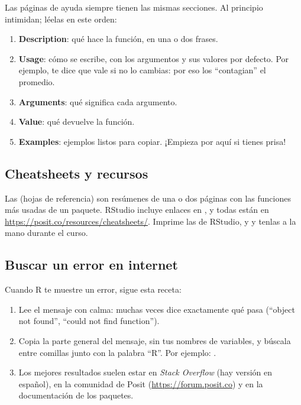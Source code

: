 Las páginas de ayuda siempre tienen las mismas secciones. Al principio
intimidan; léelas en este orden:

\begin{enumerate}
  \item \textbf{Description}: qué hace la función, en una o dos frases.
  \item \textbf{Usage}: cómo se escribe, con los argumentos y sus valores
        por defecto. Por ejemplo,  te dice que  vale  si no lo
        cambias: por eso los  ``contagian'' el promedio.
  \item \textbf{Arguments}: qué significa cada argumento.
  \item \textbf{Value}: qué devuelve la función.
  \item \textbf{Examples}: ejemplos listos para copiar. ¡Empieza por aquí
        si tienes prisa!
\end{enumerate}

\subsection{Cheatsheets y recursos}

Las  (hojas de referencia) son resúmenes de una o dos
páginas con las funciones más usadas de un paquete. RStudio incluye
enlaces en , y todas están en
\url{https://posit.co/resources/cheatsheets/}. Imprime las de RStudio,
 y  y tenlas a la mano durante el curso.

\subsection{Buscar un error en internet}

Cuando R te muestre un error, sigue esta receta:

\begin{enumerate}
  \item Lee el mensaje con calma: muchas veces dice exactamente qué pasa
        (``object not found'', ``could not find function'').
  \item Copia la parte general del mensaje, sin tus nombres de variables,
        y búscala entre comillas junto con la palabra ``R''. Por ejemplo:
        .
  \item Los mejores resultados suelen estar en \emph{Stack Overflow} (hay
        versión en español), en la comunidad de Posit
        (\url{https://forum.posit.co}) y en la documentación de los
        paquetes.
\end{enumerate}

